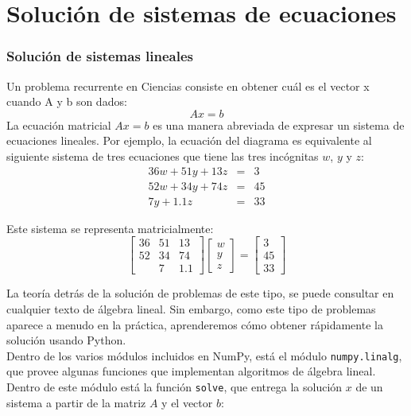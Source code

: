 \section{Solución de sistemas de ecuaciones}
\begin{frame}
\frametitle{Solución de sistemas lineales}
\fontsize{12}{12}\selectfont
Un problema recurrente en Ciencias consiste en obtener cuál es el vector x cuando A y b son dados:
\[Ax=b\]
La ecuación matricial $Ax=b$ es una manera abreviada de expresar un sistema de ecuaciones lineales. Por ejemplo, la ecuación del diagrama es equivalente al siguiente sistema de tres ecuaciones que tiene las tres incógnitas $w$, $y$ y $z$:
\begin{eqnarray*}
36w+51y+13z &=& 3 \\
52w+34y+74z &=& 45 \\
7y+1.1z &=& 33
\end{eqnarray*}
\end{frame}
\begin{frame}
Este sistema se representa matricialmente:
\[ \begin{bmatrix}
36 & 51 & 13 \\
52 & 34 & 74 \\
 & 7 &1.1
\end{bmatrix}
\begin{bmatrix}
w \\
y \\
z
\end{bmatrix} =
\begin{bmatrix}
3 \\
45 \\
33
\end{bmatrix}
\]
\end{frame}
\begin{frame}[fragile]
La teoría detrás de la solución de problemas de este tipo, se puede consultar en cualquier texto de álgebra lineal. Sin embargo, como este tipo de problemas aparece a menudo en la práctica, aprenderemos cómo obtener rápidamente la solución usando Python.
\\
\bigskip
Dentro de los varios módulos incluidos en NumPy, está el módulo \texttt{numpy.linalg}, que provee algunas funciones que implementan algoritmos de álgebra lineal. Dentro de este módulo está la función \texttt{solve}, que entrega la solución $x$ de un sistema a partir de la matriz $A$ y el vector $b$:
\end{frame}
